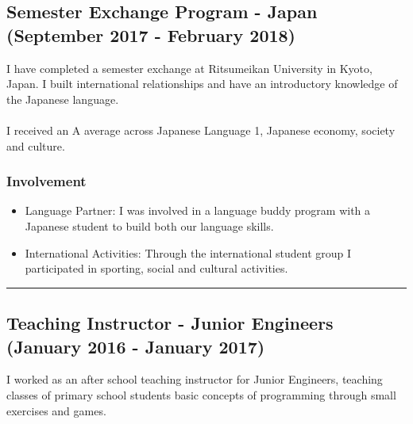\subsection*{Semester Exchange Program - Japan (September 2017 - February 2018)}
I have completed a semester exchange at Ritsumeikan University in Kyoto, Japan. I built international relationships and have an introductory knowledge of the Japanese language.\\
\\
I received an A average across Japanese Language 1, Japanese economy, society and culture.

\subsubsection*{Involvement}
\begin{itemize}
  \setlength\itemsep{0.1em}
  \item Language Partner: I was involved in a language buddy program with a Japanese student to build both our language skills.
  \item International Activities: Through the international student group I participated in sporting, social and cultural activities.
\end{itemize}

\noindent\rule{\textwidth}{0.5pt}

\subsection*{Teaching Instructor - Junior Engineers (January 2016 - January 2017)}

I worked as an after school teaching instructor for Junior Engineers, teaching classes of primary school students basic concepts of programming through small exercises and games.


